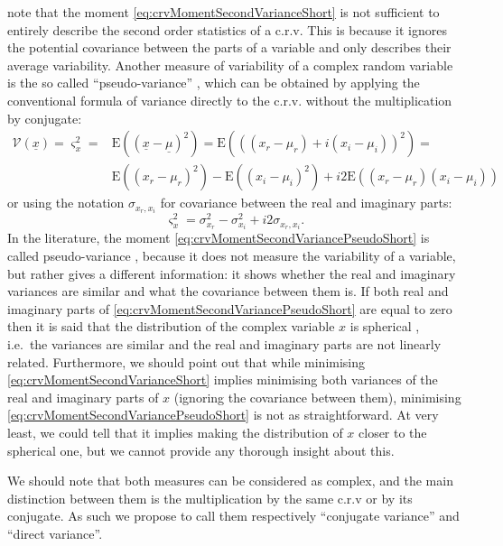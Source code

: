 \documentclass[
]{book}
\begin{document}
\citet{Picinbono} note that the moment \eqref{eq:crvMomentSecondVarianceShort} is not sufficient to entirely describe the second order statistics of a c.r.v. This is because it ignores the potential covariance between the parts of a variable and only describes their average variability. Another measure of variability of a complex random variable is the so called ``pseudo-variance'' \citep{reference}, which can be obtained by applying the conventional formula of variance directly to the c.r.v. without the multiplication by conjugate:
\begin{equation}
    \begin{aligned}
    \mathcal{V}(\underline{x}) = \varsigma_x^2 = & \mathrm{E}((\underline{x}-\underline{\mu})^2) = \mathrm{E}\left(((x_r-\mu_{r}) + i (x_i-\mu_{i}))^2\right) = \\
                    & \mathrm{E}((x_r-\mu_{r})^2) - \mathrm{E}((x_i-\mu_{i})^2) + i2 \mathrm{E}((x_r-\mu_{r})(x_i-\mu_{i}))
    \end{aligned}
    \label{eq:crvMomentSecondVariancePseudo}
\end{equation}
or using the notation \(\sigma_{x_r,x_i}\) for covariance between the real and imaginary parts:
\begin{equation}
    \varsigma_x^2 = \sigma_{x_r}^2 - \sigma_{x_i}^2 + i2 \sigma_{x_r,x_i}.
    \label{eq:crvMomentSecondVariancePseudoShort}
\end{equation}
In the literature, the moment \eqref{eq:crvMomentSecondVariancePseudoShort} is called pseudo-variance \citep{reference}, because it does not measure the variability of a variable, but rather gives a different information: it shows whether the real and imaginary variances are similar and what the covariance between them is. If both real and imaginary parts of \eqref{eq:crvMomentSecondVariancePseudoShort} are equal to zero then it is said that the distribution of the complex variable \(x\) is spherical \citep{reference}, i.e.~the variances are similar and the real and imaginary parts are not linearly related. Furthermore, we should point out that while minimising \eqref{eq:crvMomentSecondVarianceShort} implies minimising both variances of the real and imaginary parts of \(x\) (ignoring the covariance between them), minimising \eqref{eq:crvMomentSecondVariancePseudoShort} is not as straightforward. At very least, we could tell that it implies making the distribution of \(x\) closer to the spherical one, but we cannot provide any thorough insight about this.

We should note that both measures can be considered as complex, and the main distinction between them is the multiplication by the same c.r.v or by its conjugate. As such we propose to call them respectively ``conjugate variance'' and ``direct variance''.
\end{document}
